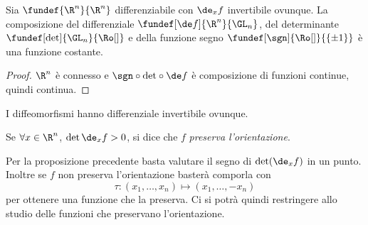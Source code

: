 \begin{prop}
	Sia $\fundef{\R^n}{\R^n}$ differenziabile con $\de_xf$ invertibile ovunque.
	La composizione del differenziale $\fundef[\de f]{\R^n}{\GL_n}$,
	del determinante $\fundef[\det]{\GL_n}{\Ro[]}$
	e della funzione segno $\fundef[\sgn]{\Ro[]}{\{\pm1\}}$
	è una funzione costante.
\end{prop}

\begin{proof}
	$\R^n$ è connesso
	e ${\sgn} \circ {\det} \circ \de f$ è composizione di funzioni continue,
	quindi continua.
\end{proof}

\begin{oss}
	I diffeomorfismi hanno differenziale invertibile ovunque.
\end{oss}

\begin{defn}
	Se $\forall x \in \R^n$, $ \det \de_xf > 0$,
	si dice che $f$ \emph{preserva l'orientazione}.
\end{defn}

\begin{oss}
	Per la proposizione precedente basta valutare il segno di $\det (\de_xf)$ in un punto.
	Inoltre se $f$ non preserva l'orientazione basterà comporla con
	\[\tau:(x_1,\dots,x_n)\mapsto (x_1,\dots,-x_n)\]
	per ottenere una funzione che la preserva.
	Ci si potrà quindi restringere allo studio delle funzioni che preservano l'orientazione.
\end{oss}

